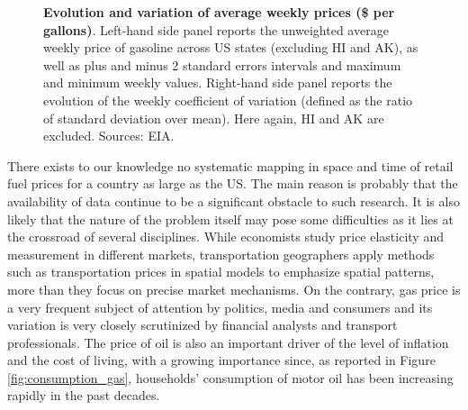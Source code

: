 \documentclass[10pt]{article}
\begin{document}
\begin{figure}
\centering
\label{fig:state}
\caption{\textbf{Evolution and variation of average weekly prices (\$ per gallons)}. Left-hand side panel reports the unweighted average weekly price of gasoline across US states (excluding HI and AK), as well as plus and minus 2 standard errors intervals and maximum and minimum weekly values. Right-hand side panel reports the evolution of the weekly coefficient of variation (defined as the ratio of standard deviation over mean). Here again, HI and AK are excluded. Sources: EIA.}
\label{fig:ts}
\end{figure}


There exists to our knowledge no systematic mapping in space and time of retail fuel prices for a country as large as the US. The main reason is probably that the availability of data continue to be a significant obstacle to such research. It is also likely that the nature of the problem itself may pose some difficulties as it lies at the crossroad of several disciplines. While economists study price elasticity and measurement in different markets, transportation geographers apply methods such as transportation prices in spatial models to emphasize spatial patterns, more than they focus on precise market mechanisms. On the contrary, gas price is a very frequent subject of attention by politics, media and consumers and its variation is very closely scrutinized by financial analysts and transport professionals. The price of oil is also an important driver of the level of inflation and the cost of living, with a growing importance since, as reported in Figure \ref{fig:consumption_gas}, households' consumption of motor oil has been increasing rapidly in the past decades.
\end{document}
